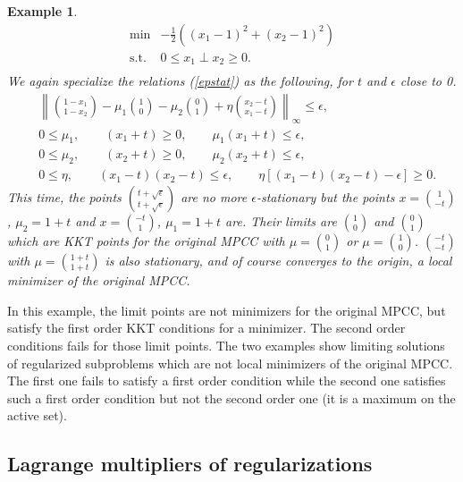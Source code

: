 \documentclass[12pt]{article}
\newtheorem{example}{Example}
\newcommand{\pref}[1]{(\ref{#1})}
\begin{document}
\begin{example}
\begin{equation}\label{MPCC_C}
 \begin{array}{ll} 
      \min &-\frac12((x_1-1)^2 + (x_2-1)^2)\\
      \textrm{s.t.}
          &0\leq x_1\perp x_2\geq0.\\
 \end{array}
\end{equation}
We again specialize the relations \pref{epstat} as the following, for $t$ and $\epsilon$ close to 0.
\begin{equation}\label{epstat_2}
\begin{array}{cl}
&\left\|{1-x_1\choose 1-x_2}-\mu_1{1\choose0} - \mu_2{0\choose1}+\eta{x_2-t\choose x_1-t}\right\|_\infty\leq\epsilon,\\
&0\leq\mu_1, \qquad(x_1+t)\geq0, \qquad\mu_1(x_1+t)\leq\epsilon, \\
&0\leq\mu_2, \qquad(x_2+t)\geq0, \qquad\mu_2(x_2+t)\leq\epsilon, \\
&0\leq\eta,\qquad(x_1-t)(x_2-t)\leq \epsilon, \qquad\eta\left[(x_1-t)(x_2-t)-\epsilon\right]\geq0.
\end{array}
\end{equation}
This time, the points $t+\sqrt{\epsilon}\choose t+\sqrt{\epsilon}$ are no more $\epsilon$-stationary but the points $x={1\choose -t}$, $\mu_2=1+t$ and $x={-t\choose 1}$, $\mu_1=1+t$ are. Their limits are $1\choose 0$ and $0\choose 1$ which are KKT points for the original MPCC with $\mu={0\choose1}$ or $\mu={1\choose0}$. ${-t\choose -t}$ with $\mu={1+t\choose 1+t}$ is also stationary, and of course converges to the origin, a local minimizer of the original MPCC.
\end{example}
In this example, the limit points are not minimizers for the original MPCC, but satisfy the first order KKT conditions for a minimizer. The second order conditions fails for those limit points. The two examples show limiting solutions of regularized subproblems which are not local minimizers of the original MPCC. The first one fails to satisfy a first order condition while the second one satisfies such a first order condition but not the second order one (it is a maximum on the active set).

\subsection{Lagrange multipliers of regularizations}
\end{document}
